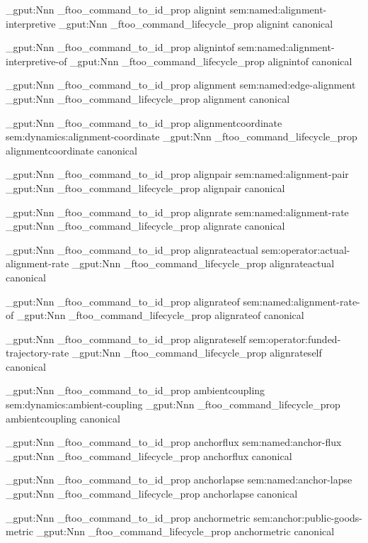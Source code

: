 \prop_gput:Nnn \g_ftoo_command_to_id_prop { alignint } { sem:named:alignment-interpretive }
\prop_gput:Nnn \g_ftoo_command_lifecycle_prop { alignint } { canonical }


\prop_gput:Nnn \g_ftoo_command_to_id_prop { alignintof } { sem:named:alignment-interpretive-of }
\prop_gput:Nnn \g_ftoo_command_lifecycle_prop { alignintof } { canonical }


\prop_gput:Nnn \g_ftoo_command_to_id_prop { alignment } { sem:named:edge-alignment }
\prop_gput:Nnn \g_ftoo_command_lifecycle_prop { alignment } { canonical }


\prop_gput:Nnn \g_ftoo_command_to_id_prop { alignmentcoordinate } { sem:dynamics:alignment-coordinate }
\prop_gput:Nnn \g_ftoo_command_lifecycle_prop { alignmentcoordinate } { canonical }


\prop_gput:Nnn \g_ftoo_command_to_id_prop { alignpair } { sem:named:alignment-pair }
\prop_gput:Nnn \g_ftoo_command_lifecycle_prop { alignpair } { canonical }


\prop_gput:Nnn \g_ftoo_command_to_id_prop { alignrate } { sem:named:alignment-rate }
\prop_gput:Nnn \g_ftoo_command_lifecycle_prop { alignrate } { canonical }


\prop_gput:Nnn \g_ftoo_command_to_id_prop { alignrateactual } { sem:operator:actual-alignment-rate }
\prop_gput:Nnn \g_ftoo_command_lifecycle_prop { alignrateactual } { canonical }


\prop_gput:Nnn \g_ftoo_command_to_id_prop { alignrateof } { sem:named:alignment-rate-of }
\prop_gput:Nnn \g_ftoo_command_lifecycle_prop { alignrateof } { canonical }


\prop_gput:Nnn \g_ftoo_command_to_id_prop { alignrateself } { sem:operator:funded-trajectory-rate }
\prop_gput:Nnn \g_ftoo_command_lifecycle_prop { alignrateself } { canonical }


\prop_gput:Nnn \g_ftoo_command_to_id_prop { ambientcoupling } { sem:dynamics:ambient-coupling }
\prop_gput:Nnn \g_ftoo_command_lifecycle_prop { ambientcoupling } { canonical }


\prop_gput:Nnn \g_ftoo_command_to_id_prop { anchorflux } { sem:named:anchor-flux }
\prop_gput:Nnn \g_ftoo_command_lifecycle_prop { anchorflux } { canonical }


\prop_gput:Nnn \g_ftoo_command_to_id_prop { anchorlapse } { sem:named:anchor-lapse }
\prop_gput:Nnn \g_ftoo_command_lifecycle_prop { anchorlapse } { canonical }


\prop_gput:Nnn \g_ftoo_command_to_id_prop { anchormetric } { sem:anchor:public-goods-metric }
\prop_gput:Nnn \g_ftoo_command_lifecycle_prop { anchormetric } { canonical }


